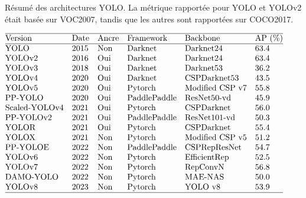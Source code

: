 \documentclass{article}
\begin{document}
\begin{table}[htbp]
\centering
\caption{Résumé des architectures YOLO. La métrique rapportée pour YOLO et YOLOv2 était basée sur VOC2007, tandis que les autres sont rapportées sur COCO2017.}
\label{tab:4}
\begin{adjustbox}{width=0.7\textwidth}
$\begin{array}{@{}llllll@{}}
\hline
\text{Version} & \text{Date} & \text{Ancre} & \text{Framework} & \text{Backbone} & \text{AP (\%)} \\
\hline
\text{YOLO} & \text{2015} & \text{Non} & \text{Darknet} & \text{Darknet24} & 63.4 \\
\text{YOLOv2} & \text{2016} & \text{Oui} & \text{Darknet} & \text{Darknet24} & 63.4 \\
\text{YOLOv3} & \text{2018} & \text{Oui} & \text{Darknet} & \text{Darknet53} & 36.2 \\
\text{YOLOv4} & \text{2020} & \text{Oui} & \text{Darknet} & \text{CSPDarknet53} & 43.5 \\
\text{YOLOv5} & \text{2020} & \text{Oui} & \text{Pytorch} & \text{Modified CSP v7} & 55.8 \\
\text{PP-YOLO} & \text{2020} & \text{Oui} & \text{PaddlePaddle} & \text{ResNet50-vd} & 45.9 \\
\text{Scaled-YOLOv4} & \text{2021} & \text{Oui} & \text{Pytorch} & \text{CSPDarknet} & 56.0 \\
\text{PP-YOLOv2} & \text{2021} & \text{Oui} & \text{PaddlePaddle} & \text{ResNet101-vd} & 50.3 \\
\text{YOLOR} & \text{2021} & \text{Oui} & \text{Pytorch} & \text{CSPDarknet} & 55.4 \\
\text{YOLOX} & \text{2021} & \text{Non} & \text{Pytorch} & \text{Modified CSP v5} & 51.2 \\
\text{PP-YOLOE} & \text{2022} & \text{Non} & \text{PaddlePaddle} & \text{CSPRepResNet} & 54.7 \\
\text{YOLOv6} & \text{2022} & \text{Non} & \text{Pytorch} & \text{EfficientRep} & 52.5 \\
\text{YOLOv7} & \text{2022} & \text{Non} & \text{Pytorch} & \text{RepConvN} & 56.8 \\
\text{DAMO-YOLO} & \text{2022} & \text{Non} & \text{Pytorch} & \text{MAE-NAS} & 50.0 \\
\text{YOLOv8} & \text{2023} & \text{Non} & \text{Pytorch} & \text{YOLO v8} & 53.9 \\
\hline
\end{array}$
\end{adjustbox}
\end{table}
\end{document}
